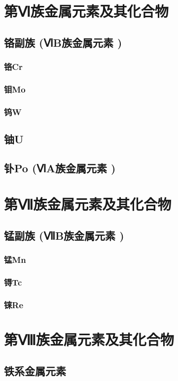 \documentclass[UTF8]{../03-Chemistry}
\begin{document}
\section{第Ⅵ族金属元素及其化合物}
    \subsection{铬副族 (ⅥB族金属元素 )}
        \subsubsection{铬Cr}
        \subsubsection{钼Mo}
        \subsubsection{钨W}
    \subsection{铀U}
    \subsection{钋Po (ⅥA族金属元素 )}
\section{第Ⅶ族金属元素及其化合物}
    \subsection{锰副族 (ⅦB族金属元素 )}
        \subsubsection{锰Mn}
        \subsubsection{锝Tc}
        \subsubsection{铼Re}
\section{第Ⅷ族金属元素及其化合物}
    \subsection{铁系金属元素}
\end{document}
